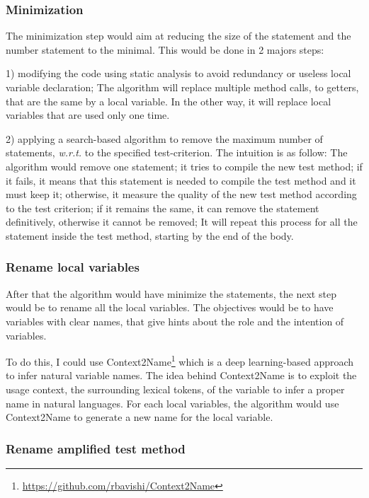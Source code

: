 \subsubsection{Minimization}
\label{subsubsec:conclusion:short-prespectives:prettifier:miminize}
The minimization step would aim at reducing the size of the statement and the number statement to the minimal.
This would be done in 2 majors steps:

1) modifying the code using static analysis to avoid redundancy or useless local variable declaration;
The algorithm will replace multiple method calls, \eg to getters, that are the same by a local variable.
In the other way, it will replace local variables that are used only one time.

2) applying a search-based algorithm to remove the maximum number of statements, \emph{w.r.t.} to the specified test-criterion.
The intuition is as follow:
The algorithm would remove one statement;
it tries to compile the new test method;
if it fails, it means that this statement is needed to compile the test method and it must keep it;
otherwise, it measure the quality of the new test method according to the test criterion;
if it remains the same, it can remove the statement definitively, otherwise it cannot be removed;
It will repeat this process for all the statement inside the test method, starting by the end of the body.

\subsubsection{Rename local variables}
\label{subsubsec:conclusion:short-prespectives:prettifier:rename-local}

After that the algorithm would have minimize the statements, the next step would be to rename all the local variables.
The objectives would be to have variables with clear names, that give hints about the role and the intention of variables.

To do this, I could use Context2Name\footnote{\url{https://github.com/rbavishi/Context2Name}}\cite{DBLP:journals/corr/abs-1809-05193} which is a deep learning-based approach to infer natural variable names.
The idea behind Context2Name is to exploit the usage context, \ie the surrounding lexical tokens, of the variable to infer a proper name in natural languages.
For each local variables, the algorithm would use Context2Name to generate a new name for the local variable.


\subsubsection{Rename amplified test method}
\label{subsubsec:conclusion:short-prespectives:prettifier:rename-method}

